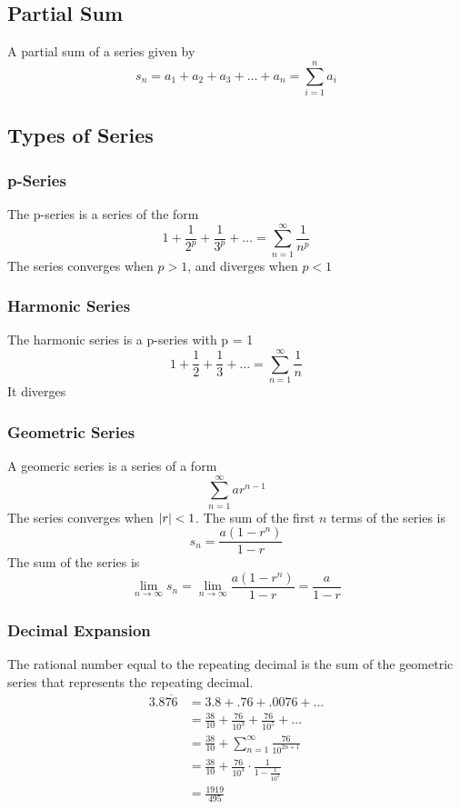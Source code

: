 \documentclass[11pt]{article}
\begin{document}
\subsection{Partial Sum}
A partial sum of a series given by 
\[
  s_n = a_1+a_2+a_3+\dots+a_n = \sum_{i=1}^{n}a_i
\]
\subsection{Types of Series}
\subsubsection*{p-Series}
The p-series is a series of the form 
\[
  1+\frac{1}{2^p}+\frac{1}{3^p}+\dots=\sum_{n=1}^\infty \frac{1}{n^p}
\]
The series converges when $p > 1$, and diverges when $p < 1$
\subsubsection*{Harmonic Series}
The harmonic series is a p-series with p = 1
\[
  1+\frac{1}{2}+\frac{1}{3}+\dots=\sum_{n=1}^\infty \frac{1}{n}
\]
It diverges
\subsubsection*{Geometric Series}
A geomeric series is a series of a form 
\[
  \sum_{n=1}^\infty ar^{n-1}
\]
The series converges when $\abs{r} < 1$.
The sum of the first $n$ terms of the series is 
\[
  s_n = \frac{a(1-r^n)}{1-r}
\]
The sum of the series is
\[
  \lim_{n\to\infty}s_n = \lim_{n\to\infty}\frac{a(1-r^n)}{1-r} = \frac{a}{1-r}
\]
\subsubsection*{Decimal Expansion}
The rational number equal to the repeating decimal is the sum of the geometric series that represents the repeating decimal. 
\[
  \begin{split}
    3.8\overline{76}&=3.8+.76+.0076+\dots\\
    &=\frac{38}{10}+\frac{76}{10^3}+\frac{76}{10^5}+\dots\\
    &=\frac{38}{10}+\sum_{n=1}^\infty\frac{76}{10^{2n+1}}\\
    &=\frac{38}{10}+\frac{76}{10^3}\cdot\frac{1}{1-\frac{1}{10^2}}\\
    &=\frac{1919}{495}
  \end{split}
\]
\end{document}

